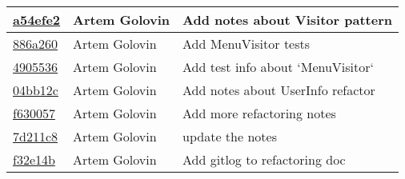 \begin{tabularx}{\textwidth}{l l X}
\href{https://github.com/awave1/assessment-loan-system/commit/a54efe2612111bb5b273db3377973cb740a51d55}{a54efe2} & Artem Golovin & Add notes about Visitor pattern\\ \hline
\href{https://github.com/awave1/assessment-loan-system/commit/886a2605f749282f45e9ef8c3c4cbe1762a68799}{886a260} & Artem Golovin & Add MenuVisitor tests\\ \hline
\href{https://github.com/awave1/assessment-loan-system/commit/490553677b59d77926ab6a3eee321a2cc350be1f}{4905536} & Artem Golovin & Add test info about `MenuVisitor`\\ \hline
\href{https://github.com/awave1/assessment-loan-system/commit/04bb12ca11d0e76f57607a9481ea5954787117b0}{04bb12c} & Artem Golovin & Add notes about UserInfo refactor\\ \hline
\href{https://github.com/awave1/assessment-loan-system/commit/f630057ca876e3222e614dc4797ef0cf1399c42d}{f630057} & Artem Golovin & Add more refactoring notes\\ \hline
\href{https://github.com/awave1/assessment-loan-system/commit/7d211c8d1556f10a63d8a0dcc3697ce279695a29}{7d211c8} & Artem Golovin & update the notes\\ \hline
\href{https://github.com/awave1/assessment-loan-system/commit/f32e14bad9c46a5fedc7f3564c868cbc29ee74f2}{f32e14b} & Artem Golovin & Add gitlog to refactoring doc\\ \hline
\end{tabularx}
